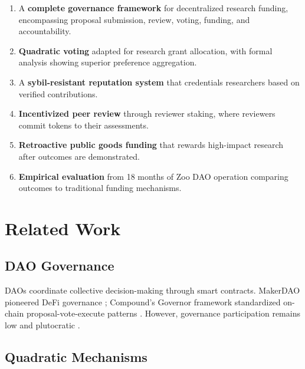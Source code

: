 \documentclass[11pt,a4paper]{article}
\begin{document}
\begin{enumerate}
  \item A \textbf{complete governance framework} for decentralized
    research funding, encompassing proposal submission, review, voting,
    funding, and accountability.

  \item \textbf{Quadratic voting} adapted for research grant allocation,
    with formal analysis showing superior preference aggregation.

  \item A \textbf{sybil-resistant reputation system} that credentials
    researchers based on verified contributions.

  \item \textbf{Incentivized peer review} through reviewer staking,
    where reviewers commit tokens to their assessments.

  \item \textbf{Retroactive public goods funding} that rewards
    high-impact research after outcomes are demonstrated.

  \item \textbf{Empirical evaluation} from 18 months of Zoo DAO
    operation comparing outcomes to traditional funding mechanisms.
\end{enumerate}


\section{Related Work}
\label{sec:related}

\subsection{DAO Governance}

DAOs coordinate collective decision-making through smart contracts.
MakerDAO pioneered DeFi governance \citep{mcdao2017}; Compound's
Governor framework standardized on-chain proposal-vote-execute patterns
\citep{compound2020governance}. However, governance participation remains
low and plutocratic \citep{barbereau2022defi}.

\subsection{Quadratic Mechanisms}
\end{document}
